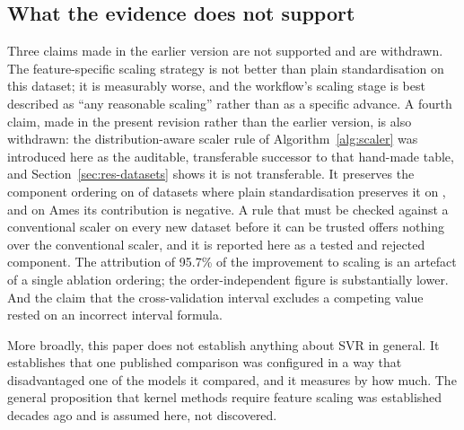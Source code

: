 \documentclass[pdflatex,sn-mathphys-num]{sn-jnl}
\begin{document}
\subsection{What the evidence does not support}\label{sec:disc-not}
Three claims made in the earlier version are not supported and are withdrawn. The feature-specific scaling strategy is not better than plain standardisation on this dataset; it is measurably worse, and the workflow's scaling stage is best described as ``any reasonable scaling'' rather than as a specific advance. A fourth claim, made in the present revision rather than the earlier version, is also withdrawn: the distribution-aware scaler rule of Algorithm~\ref{alg:scaler} was introduced here as the auditable, transferable successor to that hand-made table, and Section~\ref{sec:res-datasets} shows it is not transferable. It preserves the component ordering on \NOrderHoldsAuto{} of \NDatasets{} datasets where plain standardisation preserves it on \NOrderHoldsUni{}, and on Ames its contribution is negative. A rule that must be checked against a conventional scaler on every new dataset before it can be trusted offers nothing over the conventional scaler, and it is reported here as a tested and rejected component. The attribution of 95.7\% of the improvement to scaling is an artefact of a single ablation ordering; the order-independent figure is substantially lower. And the claim that the cross-validation interval excludes a competing value rested on an incorrect interval formula.

More broadly, this paper does not establish anything about SVR in general. It establishes that one published comparison was configured in a way that disadvantaged one of the models it compared, and it measures by how much. The general proposition that kernel methods require feature scaling was established decades ago \cite{sola1997,hsu2003,smola2004} and is assumed here, not discovered.
\end{document}
